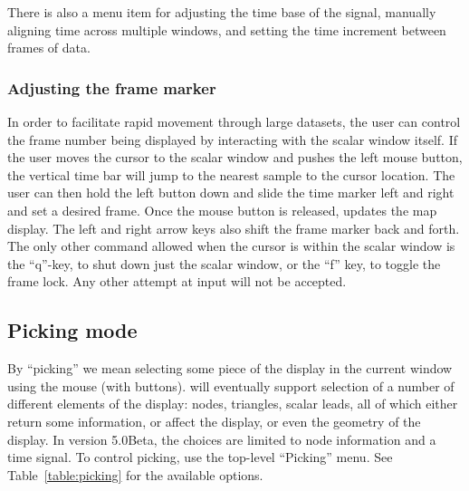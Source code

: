 There is also a menu item for adjusting the time base of the signal,
manually aligning time across multiple windows, and setting the time
increment between frames of data.

\subsubsection{Adjusting the frame marker}

In order to facilitate rapid movement through large datasets, the user can
control the frame number being displayed by interacting with the scalar
window itself.  If the user moves the cursor to the scalar window and
pushes the left mouse button, the vertical time bar will jump to the
nearest sample to the cursor location.  The user can then hold the left
button down and slide the time marker left and right and set a desired
frame.  Once the mouse button is released,\map{} updates the map display.
The left and right arrow keys also shift the frame marker back and forth.
The only other command allowed when the cursor is within the scalar window
is the ``q''-key, to shut down just the scalar window, or the ``f'' key,
to toggle the frame lock.  Any other attempt at input will not be accepted.



\subsection{Picking mode}
\label{sec:control-picking} 

By ``picking'' we mean selecting some piece of the display in the current
window using the mouse (with buttons).  \map{} will eventually support
selection of a number of different elements of the display: nodes,
triangles, scalar leads, \etc{} all of which either return some
information, or affect the display, or even the geometry of the display.
In version 5.0Beta, the choices are limited to node information and a time
signal.  To control picking, use the top-level ``Picking'' menu. See
Table~\ref{table:picking} for the available options.




